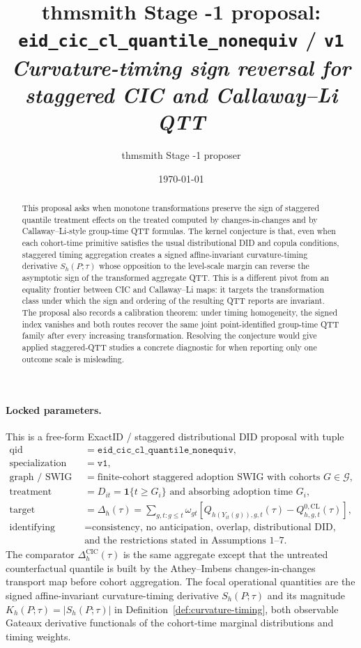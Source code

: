 \documentclass[11pt]{article}
\title{thmsmith Stage -1 proposal: \texttt{eid\_cic\_cl\_quantile\_nonequiv} / \texttt{v1}%
  \\ \large\textit{Curvature-timing sign reversal for staggered CIC and Callaway--Li QTT}}
\author{thmsmith Stage -1 proposer}
\date{\today}
\newcommand{\one}{\mathbf{1}}
\theoremstyle{definition}
\theoremstyle{plain}
\theoremstyle{remark}
\begin{document}
\maketitle


\paragraph{Locked parameters.}
This is a free-form ExactID / staggered distributional DID proposal with tuple
\[
\begin{array}{ll}
\text{qid} & = \texttt{eid\_cic\_cl\_quantile\_nonequiv},\\
\text{specialization} & = \texttt{v1},\\
\text{graph / SWIG} & = \text{finite-cohort staggered adoption SWIG with cohorts }G\in\mathcal G,\\
\text{treatment} & = D_{it}=\one\{t\ge G_i\}\text{ and absorbing adoption time }G_i,\\
\text{target estimand} & =
  \Delta_h(\tau)=\sum_{g,t:g\le t}\omega_{gt}
  \left[Q_{h(Y_{it}(g)),g,t}(\tau)-Q^{0,\mathrm{CL}}_{h,g,t}(\tau)\right],\\
\text{identifying assumptions} & =
  \text{consistency, no anticipation, overlap, distributional DID,}\\
& \text{and the restrictions stated in Assumptions 1--7.}
\end{array}
\]
The comparator \(\Delta^{\mathrm{CIC}}_h(\tau)\) is the same aggregate except that
the untreated counterfactual quantile is built by the Athey--Imbens changes-in-changes
transport map before cohort aggregation.  The focal operational quantities are the
signed affine-invariant curvature-timing derivative \(S_h(P;\tau)\) and its
magnitude \(K_h(P;\tau)=|S_h(P;\tau)|\) in
Definition~\ref{def:curvature-timing}, both observable Gateaux derivative
functionals of the cohort-time marginal distributions and timing weights.

\begin{abstract}
This proposal asks when monotone transformations preserve the sign of staggered
quantile treatment effects on the treated computed by changes-in-changes and by
Callaway--Li-style group-time QTT formulas.  The kernel conjecture is that, even
when each cohort-time primitive satisfies the usual distributional DID and copula
conditions, staggered timing aggregation creates a signed affine-invariant
curvature-timing derivative \(S_h(P;\tau)\) whose opposition to the level-scale
margin can reverse the asymptotic sign of the transformed aggregate QTT.  This is a different pivot from an
equality frontier between CIC and Callaway--Li maps: it targets the transformation
class under which the sign and ordering of the resulting QTT reports are invariant.
The proposal also records a calibration theorem: under timing homogeneity, the
signed index vanishes and both routes recover the same joint point-identified group-time
QTT family after every increasing transformation.  Resolving the conjecture would
give applied staggered-QTT studies a concrete diagnostic for when reporting only
one outcome scale is misleading.
\end{abstract}
\end{document}
